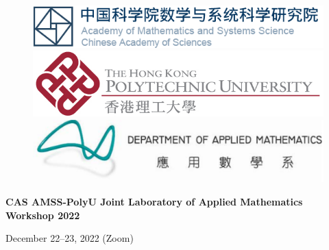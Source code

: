 \documentclass[
	openany, %
	parskip=full, %
	12pt, %
	a4paper, %
]{conferencebooklet} %
\begin{document}
\vspace*{3cm}
\begin{center}

%
%


\thispagestyle{empty}


\begin{figure}
\begin{multicols}{3}
\centering
\includegraphics[width=.99\linewidth]{amss_long.png}\\
\hspace{3ex}\includegraphics[width=.76\linewidth]{polyu.png}\\
\includegraphics[width=.8\linewidth]{ama.png}\\
\end{multicols}
\end{figure}

\LARGE\textbf{CAS AMSS-PolyU Joint Laboratory of Applied Mathematics Workshop 2022}




\vspace*{2cm}
\Large

December 22--23, 2022 (Zoom)


\end{center}
\end{document}
